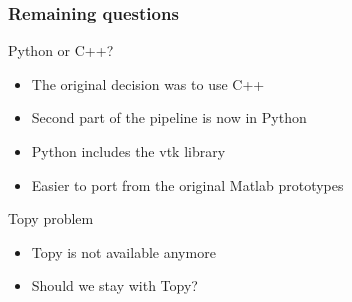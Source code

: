 \begin{frame}

	\frametitle{Remaining questions}
	
	\begin{block}{Python or C++?}

	\begin{itemize}
	\item The original decision was to use C++ 
	\item Second part of the pipeline is now in Python
	\item Python includes the vtk library  
	\item Easier to port from the original Matlab prototypes
	\end{itemize}	
	\end{block}
	
	\begin{block}{Topy problem}
	\begin{itemize}
	\item Topy is not available anymore
	\item Should we stay with Topy?
	\end{itemize}

	\end{block}
	
\end{frame}








